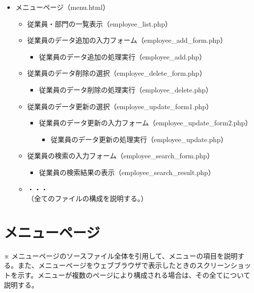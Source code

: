 \documentclass[a4j,12pt]{jreport}
\begin{document}
\begin{itemize}
\item メニューページ（menu.html）
	\begin{itemize}
	\item 従業員・部門の一覧表示（employee\_list.php）
	\item 従業員のデータ追加の入力フォーム（employee\_add\_form.php）
		\begin{itemize}
			\item 従業員のデータ追加の処理実行（employee\_add.php）
		\end{itemize}
	\item 従業員のデータ削除の選択（employee\_delete\_form.php）
		\begin{itemize}
			\item 従業員のデータ削除の処理実行（employee\_delete.php）
		\end{itemize}
	\item 従業員のデータ更新の選択（employee\_update\_form1.php）
		\begin{itemize}
			\item 従業員のデータ更新の入力フォーム（employee\_update\_form2.php）
			\begin{itemize}
				\item 従業員のデータ更新の処理実行（employee\_update.php）
			\end{itemize}
		\end{itemize}
	\item 従業員の検索の入力フォーム（employee\_search\_form.php）
		\begin{itemize}
			\item 従業員の検索結果の表示（employee\_search\_result.php）
		\end{itemize}
	\item ・・・\\ （全てのファイルの構成を説明する。）
	\end{itemize}
\end{itemize}


\section{メニューページ}

※ メニューページのソースファイル全体を引用して、メニューの項目を説明する。また、メニューページをウェブブラウザで表示したときのスクリーンショットを示す。メニューが複数のページにより構成される場合は、その全てについて説明する。\\
\end{document}
